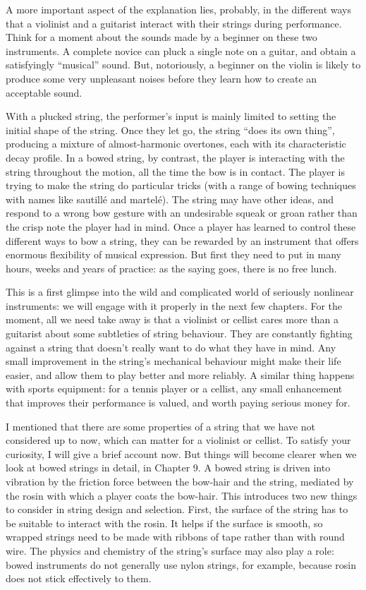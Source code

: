   A more important aspect of the explanation lies, probably, in the different 
  ways that a violinist and a guitarist interact with their strings during 
  performance. Think for a moment about the sounds made by a beginner on these 
  two instruments. A complete novice can pluck a single note on a guitar, and 
  obtain a satisfyingly “musical” sound. But, notoriously, a beginner on the 
  violin is likely to produce some very unpleasant noises before they learn how 
  to create an acceptable sound. 

  With a plucked string, the performer’s input is mainly limited to setting the 
  initial shape of the string. Once they let go, the string “does its own 
  thing”, producing a mixture of almost-harmonic overtones, each with its 
  characteristic decay profile. In a bowed string, by contrast, the player is 
  interacting with the string throughout the motion, all the time the bow is in 
  contact. The player is trying to make the string do particular tricks (with a 
  range of bowing techniques with names like sautillé and martelé). The string 
  may have other ideas, and respond to a wrong bow gesture with an undesirable 
  squeak or groan rather than the crisp note the player had in mind. Once a 
  player has learned to control these different ways to bow a string, they can 
  be rewarded by an instrument that offers enormous flexibility of musical 
  expression. But first they need to put in many hours, weeks and years of 
  practice: as the saying goes, there is no free lunch. 

  This is a first glimpse into the wild and complicated world of seriously 
  nonlinear instruments: we will engage with it properly in the next few 
  chapters. For the moment, all we need take away is that a violinist or 
  cellist cares more than a guitarist about some subtleties of string 
  behaviour. They are constantly fighting against a string that doesn’t really 
  want to do what they have in mind. Any small improvement in the string’s 
  mechanical behaviour might make their life easier, and allow them to play 
  better and more reliably. A similar thing happens with sports equipment: for 
  a tennis player or a cellist, any small enhancement that improves their 
  performance is valued, and worth paying serious money for. 

  I mentioned that there are some properties of a string that we have not 
  considered up to now, which can matter for a violinist or cellist. To satisfy 
  your curiosity, I will give a brief account now. But things will become 
  clearer when we look at bowed strings in detail, in Chapter 9. A bowed string 
  is driven into vibration by the friction force between the bow-hair and the 
  string, mediated by the rosin with which a player coats the bow-hair. This 
  introduces two new things to consider in string design and selection. First, 
  the surface of the string has to be suitable to interact with the rosin. It 
  helps if the surface is smooth, so wrapped strings need to be made with 
  ribbons of tape rather than with round wire. The physics and chemistry of the 
  string's surface may also play a role: bowed instruments do not generally use 
  nylon strings, for example, because rosin does not stick effectively to them. 

